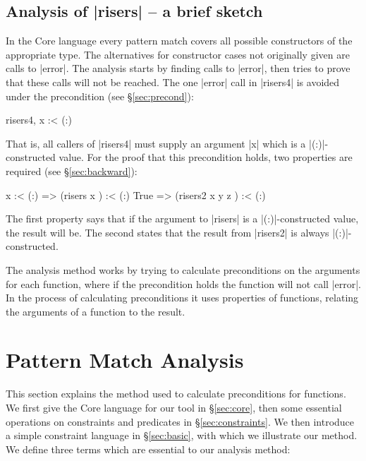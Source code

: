 \documentclass[preprint]{sigplanconf}
\begin{document}
\subsection{Analysis of |risers| -- a brief sketch}

In the Core language every pattern match covers all possible constructors of the appropriate type. The alternatives for constructor cases not originally given are calls to |error|. The analysis starts by finding calls to |error|, then tries to prove that these calls will not be reached. The one |error| call in |risers4| is avoided under the precondition (see \S\ref{sec:precond}):

\ignore\begin{code}
risers4, x :< (:)
\end{code}

\noindent That is, all callers of |risers4| must supply an argument |x| which is a |(:)|-constructed value. For the proof that this precondition holds, two properties are required (see \S\ref{sec:backward}):

\ignore\begin{code}
x :< (:)  => (risers x       ) :< (:)
True      => (risers2 x y z  ) :< (:)
\end{code}

\noindent The first property says that if the argument to |risers| is a |(:)|-constructed value, the result will be. The second states that the result from |risers2| is always |(:)|-constructed.

The analysis method works by trying to calculate preconditions on the arguments for each function, where if the precondition holds the function will not call |error|. In the process of calculating preconditions it uses properties of functions, relating the arguments of a function to the result.

\section{Pattern Match Analysis}
\label{sec:manipulate}

This section explains the method used to calculate preconditions for functions. We first give the Core language for our tool in \S\ref{sec:core}, then some essential operations on constraints and predicates in \S\ref{sec:constraints}. We then introduce a simple constraint language in \S\ref{sec:basic}, with which we illustrate our method. We define three terms which are essential to our analysis method:
\end{document}
